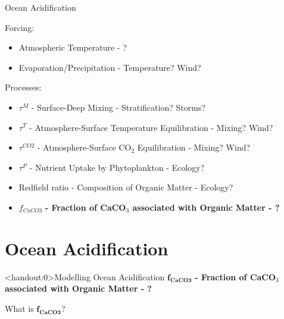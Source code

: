 \begin{frame}{Ocean Acidification}
    
    Forcing:
    \begin{itemize}
        \item Atmospheric Temperature - {\color{QESdarkblue} ?}
        \item Evaporation/Precipitation - {\color{QESdarkblue} Temperature? Wind?}
    \end{itemize}

    Processes:
    \begin{itemize}
        \item $\tau^M$ - Surface-Deep Mixing - {\color{QESdarkblue} Stratification? Storms?}
        \item $\tau^T$ - Atmosphere-Surface Temperature Equilibration - {\color{QESdarkblue} Mixing? Wind?}
        \item $\tau^{CO2}$ - Atmosphere-Surface CO$_2$ Equilibration - {\color{QESdarkblue} Mixing? Wind?}
        \item $\tau^P$ - Nutrient Uptake by Phytoplankton - {\color{QESdarkblue} Ecology?}
        \item Redfield ratio - Composition of Organic Matter - {\color{QESdarkblue} Ecology?}
        \item {\color{red}${f_{CaCO3}}$ \textbf{- Fraction of CaCO$_3$ associated with Organic Matter - {\color{QESdarkblue} \ce{\Omega}?}}}
    \end{itemize}

\end{frame}

\section{Ocean Acidification}

\begin{frame}<handout:0>{Modelling Ocean Acidification}
    $\mathbf{f_{CaCO3}}$ \textbf{- Fraction of CaCO$_3$ associated with Organic Matter - {\color{QESdarkblue} \ce{\Omega}?}}
    
    \bigskip
    \bigskip
    \bigskip
    
    \hspace*{3cm}What is $\mathbf{f_{CaCO3}}$?
\end{frame}

